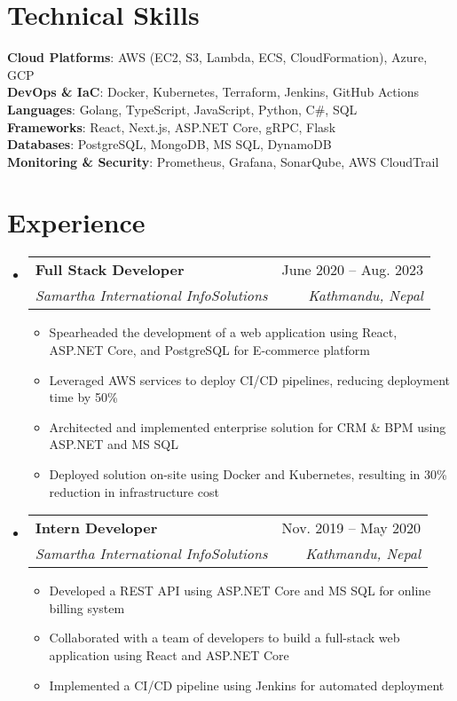 \documentclass[letterpaper,11pt]{article}
\makeatletter
\newcommand{\resumeItem}[1]{
  \item\small{
    {#1 \vspace{-2pt}}
  }
}
\newcommand{\resumeSubheading}[4]{
  \vspace{-2pt}\item
    \begin{tabular*}{0.97\textwidth}[t]{l@{\extracolsep{\fill}}r}
      \textbf{#1} & #2 \\
      \textit{\small#3} & \textit{\small #4} \\
    \end{tabular*}\vspace{-7pt}
}
\newcommand{\resumeSubHeadingListStart}{\begin{itemize}[leftmargin=0.15in, label={}]}
\newcommand{\resumeSubHeadingListEnd}{\end{itemize}}
\newcommand{\resumeItemListStart}{\begin{itemize}}
\newcommand{\resumeItemListEnd}{\end{itemize}\vspace{-5pt}}
\makeatother
\begin{document}
%
\section{Technical Skills}
 \begin{itemize}[leftmargin=0.15in, label={}]
    \small{\item{
        {\textbf{Cloud Platforms}: AWS (EC2, S3, Lambda, ECS, CloudFormation), Azure, GCP}\\
        {\textbf{DevOps \& IaC}: Docker, Kubernetes, Terraform, Jenkins, GitHub Actions}\\
        {\textbf{Languages}: Golang, TypeScript, JavaScript, Python, C\#, SQL}\\
        {\textbf{Frameworks}: React, Next.js, ASP.NET Core, gRPC, Flask}\\
        {\textbf{Databases}: PostgreSQL, MongoDB, MS SQL, DynamoDB}\\
        {\textbf{Monitoring \& Security}: Prometheus, Grafana, SonarQube, AWS CloudTrail}
    }}
 \end{itemize}



\section{Experience}
  \resumeSubHeadingListStart

    \resumeSubheading
      {Full Stack Developer}{June 2020 -- Aug. 2023}
      {Samartha International InfoSolutions}{Kathmandu, Nepal}
      \resumeItemListStart
        \resumeItem{Spearheaded the development of a web application using React, ASP.NET Core, and PostgreSQL for E-commerce platform}
        \resumeItem{Leveraged AWS services to deploy CI/CD pipelines, reducing deployment time by 50\%}
        \resumeItem{Architected and implemented enterprise solution for CRM \& BPM using ASP.NET and MS SQL}
        \resumeItem{Deployed solution on-site using Docker and Kubernetes, resulting in 30\% reduction in infrastructure cost}
      \resumeItemListEnd

      \resumeSubheading
      {Intern Developer}{Nov. 2019 -- May 2020}
      {Samartha International InfoSolutions}{Kathmandu, Nepal}
      \resumeItemListStart
        \resumeItem{Developed a REST API using ASP.NET Core and MS SQL for online billing system}
        \resumeItem{Collaborated with a team of developers to build a full-stack web application using React and ASP.NET Core}
        \resumeItem{Implemented a CI/CD pipeline using Jenkins for automated deployment}
      \resumeItemListEnd
  \resumeSubHeadingListEnd
\end{document}
